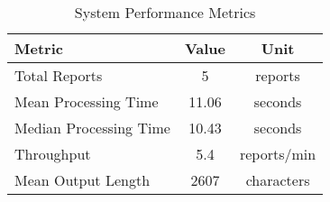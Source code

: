 \begin{table}[h]
\centering
\caption{System Performance Metrics}
\label{tab:performance}
\begin{tabular}{lcc}
\hline
\textbf{Metric} & \textbf{Value} & \textbf{Unit} \\
\hline
Total Reports & 5 & reports \\
Mean Processing Time & 11.06 & seconds \\
Median Processing Time & 10.43 & seconds \\
Throughput & 5.4 & reports/min \\
Mean Output Length & 2607 & characters \\
\hline
\end{tabular}
\end{table}